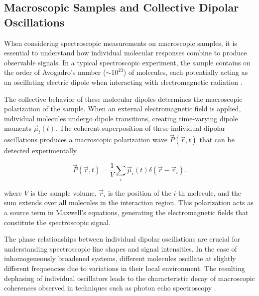 \subsection{Macroscopic Samples and Collective Dipolar Oscillations}
\label{subsec:macroscopic_samples}

\noindent 
When considering spectroscopic measurements on macroscopic samples, it is essential to understand how individual molecular responses combine to produce observable signals. In a typical spectroscopic experiment, the sample contains on the order of Avogadro's number ($\sim 10^{23}$) of molecules, each potentially acting as an oscillating electric dipole when interacting with electromagnetic radiation \cite{feynman1965feynmanlecturesphysics}.

\noindent 
The collective behavior of these molecular dipoles determines the macroscopic polarization of the sample. When an external electromagnetic field is applied, individual molecules undergo dipole transitions, creating time-varying dipole moments $\vec{\mu}_i(t)$. The coherent superposition of these individual dipolar oscillations produces a macroscopic polarization wave $\vec{P}(\vec{r}, t)$ that can be detected experimentally

\begin{equation}
	\vec{P}(\vec{r}, t) = \frac{1}{V} \sum_{i} \vec{\mu}_i(t) \delta(\vec{r} - \vec{r}_i).
	\label{eq:macroscopic_polarization}
\end{equation}

\noindent 
where $V$ is the sample volume, $\vec{r}_i$ is the position of the $i$-th molecule, and the sum extends over all molecules in the interaction region. This polarization acts as a source term in Maxwell's equations, generating the electromagnetic fields that constitute the spectroscopic signal.

\noindent 
The phase relationships between individual dipolar oscillations are crucial for understanding spectroscopic line shapes and signal intensities. In the case of inhomogeneously broadened systems, different molecules oscillate at slightly different frequencies due to variations in their local environment. The resulting dephasing of individual oscillators leads to the characteristic decay of macroscopic coherences observed in techniques such as photon echo spectroscopy \cite{mukamel1995principlesnonlinearoptical}.


